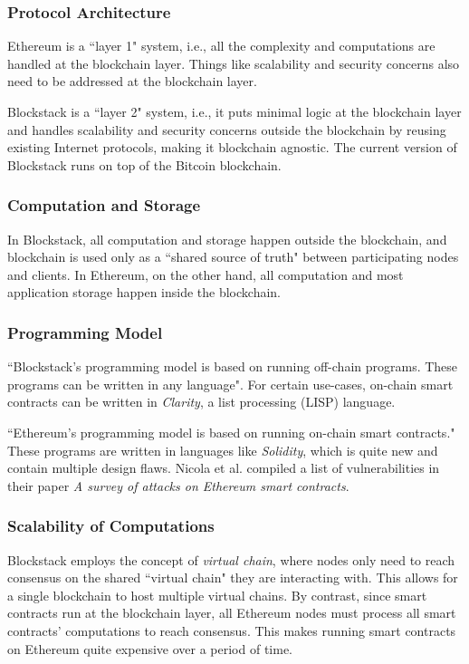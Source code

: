 			\subsubsection{Protocol Architecture}
			Ethereum is a ``layer 1" system, i.e., all the complexity and computations are handled at the blockchain layer. Things like scalability and security concerns also need to be addressed at the blockchain layer. 
			
			Blockstack is a ``layer 2" system, i.e., it puts minimal logic at the blockchain layer and handles scalability and security concerns outside the blockchain by reusing existing Internet protocols, making it blockchain agnostic. The current version of Blockstack runs on top of the Bitcoin blockchain.
			
			\subsubsection{Computation and Storage}
			In Blockstack, all computation and storage happen outside the blockchain, and blockchain is used only as a ``shared source of truth" between participating nodes and clients. In Ethereum, on the other hand, all computation and most application storage happen inside the blockchain.
			
			\subsubsection{Programming Model}
			``Blockstack's programming model is based on running off-chain programs. These programs can be written in any language". For certain use-cases, on-chain smart contracts can be written in \textit{Clarity}\cite{doc:clarity:2}, a list processing (LISP) language.
			
			``Ethereum's programming model is based on running on-chain smart contracts." These programs are written in languages like \textit{Solidity}\cite{github:solidity:1}, which is quite new and contain multiple design flaws. Nicola et al. compiled a list of vulnerabilities in their paper \textit{A survey of attacks on Ethereum smart contracts}\cite{atzei2016survey}.
			
			\subsubsection{Scalability of Computations}
			Blockstack employs the concept of \textit{virtual chain}\cite{nelson2016extending}, where nodes only need to reach consensus on the shared ``virtual chain" they are interacting with. This allows for a single blockchain to host multiple virtual chains. By contrast, since smart contracts run at the blockchain layer, all Ethereum nodes must process all smart contracts' computations to reach consensus. This makes running smart contracts on Ethereum quite expensive over a period of time.
			
